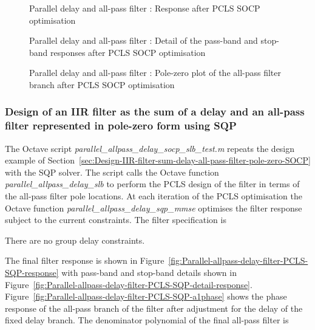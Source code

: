 \documentclass[a4paper,twoside,10pt,english]{report}
\begin{document}
\begin{figure}[!htbp]
\begin{center}
\scalebox{0.7}{}
\caption{Parallel delay and all-pass filter : Response after PCLS SOCP optimisation}
\label{fig:Parallel-allpass-delay-filter-PCLS-SOCP-response}
\end{center}
\end{figure}
\begin{figure}[!htbp]
\begin{center}
\scalebox{0.7}{}
\caption{Parallel delay and all-pass filter : Detail of the pass-band and
  stop-band responses after PCLS SOCP optimisation}
\label{fig:Parallel-allpass-delay-filter-PCLS-SOCP-detail-response}
\end{center}
\end{figure}
\begin{figure}[!htbp]
\begin{center}
\scalebox{0.7}{}
\caption{Parallel delay and all-pass filter : Pole-zero plot of the all-pass filter branch after PCLS SOCP optimisation}
\label{fig:Parallel-allpass-delay-filter-PCLS-SOCP-a1pz}
\end{center}
\end{figure}
\clearpage
\subsubsection{\label{sec:Design-IIR-filter-sum-delay-all-pass-filter-pole-zero-SQP}Design of an IIR filter as the sum of a delay and an all-pass filter represented in pole-zero form using SQP}
The Octave script \emph{parallel\_allpass\_delay\_socp\_slb\_test.m} repeats
the design example of
Section~\ref{sec:Design-IIR-filter-sum-delay-all-pass-filter-pole-zero-SOCP}
with the SQP solver. The script calls the Octave function
\emph{parallel\_allpass\_delay\_slb} to perform the PCLS design of the filter
in terms of the all-pass filter pole locations. At each iteration of the PCLS
optimisation the Octave function \emph{parallel\_allpass\_delay\_sqp\_mmse}
optimises the filter response subject to the current constraints. The filter
specification is
\begin{small}
  
\end{small}
There are no group delay constraints.

The final filter response is shown in
Figure~\ref{fig:Parallel-allpass-delay-filter-PCLS-SQP-response} with pass-band
and stop-band details shown in 
Figure~\ref{fig:Parallel-allpass-delay-filter-PCLS-SQP-detail-response}. 
Figure~\ref{fig:Parallel-allpass-delay-filter-PCLS-SQP-a1phase} shows
the phase response of the all-pass branch of the filter after adjustment
for the delay of the fixed delay branch.
The denominator polynomial of the final all-pass filter is
\begin{small}

\end{small}
\end{document}
